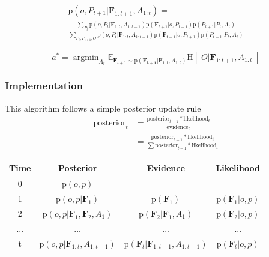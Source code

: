 \documentclass[conference]{IEEEtran}
\newcommand{\prob}[1]{\text{p}(#1)} %
\newcommand{\set}[1]{\mathbf{#1}} %
\DeclareMathOperator*{\argmin}{argmin}
\newcommand{\entropy}[1]{\text{H}\left[\;#1 \; \right]} %
\newcommand{\expectedValue}[2]{\hollow{E}_{#2}#1} %
\newcommand{\hollow}[1]{\mathbb{#1}} %
\begin{document}
        \begin{multline}
            \label{eq:fullPosterior}
            \prob{o,P_{t+1}|\set{F}_{1:t+1},A_{1:t}} = \\ \frac{ \sum_{P_t} \prob{o,P_t|\set{F}_{1:t},A_{1:t-1}} \prob{\set{F}_{t+1}|o,P_{t+1}} \prob{P_{t+1}|P_t,A_t}}{\sum_{P_t,P_{t+1},O} \prob{o,P_t|\set{F}_{1:t},A_{1:t-1}} \prob{\set{F}_{t+1}|o,P_{t+1}} \prob{P_{t+1}|P_t,A_t}}
        \end{multline}

        \begin{equation}
            a^* = \argmin_{A_t} \expectedValue{ \entropy{O|\set{F}_{1:t+1},A_{1:t}} }{\set{F}_{t+1} \sim \prob{\set{F_{t+1}}|\set{F}_{1:t},A_{1:t}}}
        \end{equation}

        \subsubsection{Implementation}

        This algorithm follows a simple posterior update rule
        \begin{align}
            \text{posterior}_t &= \frac{\text{posterior}_{t-1}*\text{likelihood}_t}{\text{evidence}_t}\\
            &= \frac{\text{posterior}_{t-1}*\text{likelihood}_t}{\sum \text{posterior}_{t-1}*\text{likelihood}_t}
        \end{align}

        \begin{table}[h]
          \begin{tabular}{c|c|c|c} %
            \hline %
            Time & Posterior & Evidence & Likelihood\\
            [0.5ex] %
            \hline\hline %
            0 & $\prob{o,p}$ & & \\[0.5ex] 
            1 & $\prob{o,p|\set{F}_1}$ & $\prob{\set{F}_1}$ & $\prob{\set{F}_1|o,p}$ \\[0.5ex] 
            2 & $\prob{o,p|\set{F}_1,\set{F}_2,A_1}$ & $\prob{\set{F}_2|\set{F}_1,A_1}$ & $\prob{\set{F}_2|o,p}$ \\
            ...&...&...&...\\[0.5ex] 
            t & $\prob{o,p|\set{F}_{1:t},A_{1:t-1}}$ & $\prob{\set{F}_t|\set{F}_{1:t-1},A_{1:t-1}}$ & $\prob{\set{F}_t|o,p}$
          \end{tabular}
        \end{table}
\end{document}
